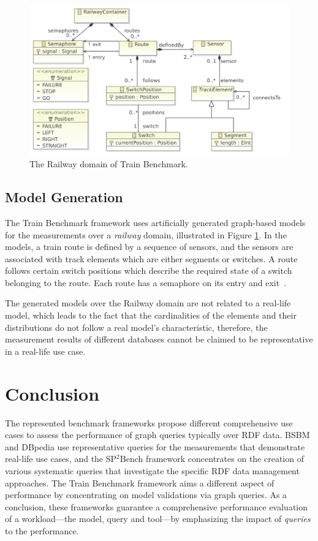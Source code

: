 \begin{figure}[!ht]
	\centering
	\includegraphics[width=150mm, keepaspectratio]{figures/railway-containments.pdf}
	\caption{The Railway domain of Train Benchmark.}
	\label{fig:tb_domain}
\end{figure}

\subsection{Model Generation}

The Train Benchmark framework uses artificially generated graph-based models for the measurements over a \textit{railway} domain, illustrated in Figure \ref{fig:tb_domain}. In the models, a train route is defined by a sequence of sensors, and the sensors are associated with track elements which are either segments or switches. A route follows certain switch positions which describe the required state of a switch belonging to the route. Each route has a semaphore on its entry and exit~\cite{train_ttc}.

The generated models over the Railway domain are not related to a real-life model, which leads to the fact that the cardinalities of the elements and their distributions do not follow a real model's characteristic, therefore, the measurement results of different databases cannot be claimed to be representative in a real-life use case.

\section{Conclusion} \label{sec:benchmark_conclusions}

The represented benchmark frameworks propose different comprehensive use cases to assess the performance of graph queries typically over RDF data. BSBM and DBpedia use representative queries for the measurements that demonstrate real-life use cases, and the SP$^2$Bench framework concentrates on the creation of various systematic queries that investigate the specific RDF data management approaches. The Train Benchmark framework aims a different aspect of performance by concentrating on model validations via graph queries. As a conclusion, these frameworks guarantee a comprehensive performance evaluation of a workload---the model, query and tool---by emphasizing the impact of \textit{queries} to the performance.


